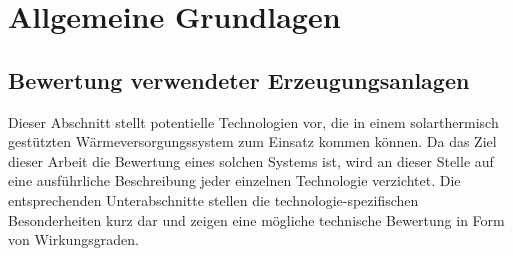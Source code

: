 \chapter{Allgemeine Grundlagen}\label{chapter: Allgemeine Grundlagen}
\thispagestyle{empty}
\section{Bewertung verwendeter Erzeugungsanlagen}
Dieser Abschnitt stellt potentielle Technologien vor, die in einem solarthermisch gestützten Wärmeversorgungssystem zum Einsatz kommen können. Da das Ziel dieser Arbeit die Bewertung eines solchen Systems ist, wird an dieser Stelle auf eine ausführliche Beschreibung jeder einzelnen Technologie verzichtet. Die entsprechenden Unterabschnitte stellen die technologie-spezifischen Besonderheiten kurz dar und zeigen eine mögliche technische Bewertung in Form von Wirkungsgraden.
